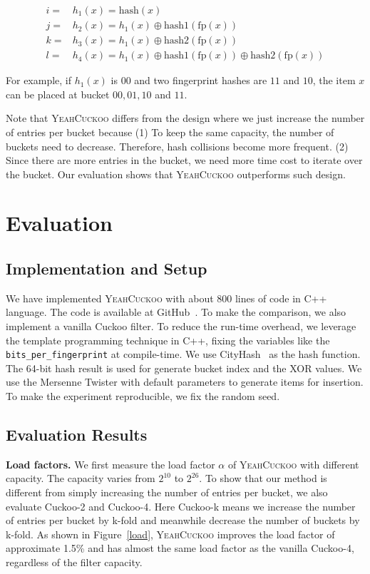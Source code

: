 \documentclass[11pt]{IEEEtran}
\newcommand{\nosection}[1]{\vspace{3pt}\noindent\textbf{#1}}
\newcommand{\sys}{\textsc{YeahCuckoo}\xspace}
\begin{document}
\begin{equation*}
\begin{split}
i =& h_1(x) = \text{hash}(x) \\
j =& h_2(x) = h_1(x) \oplus \text{hash1}(\text{fp}(x))\\
k =& h_3(x) = h_1(x) \oplus \text{hash2}(\text{fp}(x)) \\
l =& h_4(x) = h_1(x) \oplus \text{hash1}(\text{fp}(x)) \oplus \text{hash2}(\text{fp}(x))
\end{split}
\end{equation*}

For example, if $h_1(x)$ is 00 and two fingerprint hashes are $11$ and $10$, the item $x$ can be placed at bucket $00, 01,10$ and $11$. 

Note that \sys differs from the design where we just increase the number of entries per bucket because (1) To keep the same capacity, the number of buckets need to decrease. Therefore, hash collisions become more frequent. (2) Since there are more entries in the bucket, we need more time cost to iterate over the bucket. Our evaluation shows that \sys outperforms such design.

\section{Evaluation}

\subsection{Implementation and Setup}

We have implemented \sys with about 800 lines of code in C++ language. The code is available at GitHub~\cite{yeah}. To make the comparison, we also implement a vanilla Cuckoo filter. To reduce the run-time overhead, we leverage the template programming technique in C++, fixing the variables like the \verb|bits_per_fingerprint| at compile-time. We use CityHash~\cite{cityhash} as the hash function. The 64-bit hash result is used for generate bucket index and the XOR values. We use the Mersenne Twister with default parameters to generate items for insertion. To make the experiment reproducible, we fix the random seed. 

\subsection{Evaluation Results}			

\nosection{Load factors.} We first measure the load factor $\alpha$ of \sys with different capacity. The capacity varies from $2^{10}$ to $2^{26}$. To show that our method is different from simply increasing the number of entries per bucket, we also evaluate Cuckoo-2 and Cuckoo-4. Here Cuckoo-k means we increase the number of entries per bucket by k-fold and meanwhile decrease the number of buckets by k-fold. As shown in Figure~\ref{load}, \sys  improves the load factor of approximate 1.5\% and has almost the same load factor as the vanilla Cuckoo-4, regardless of the filter capacity.
\end{document}
